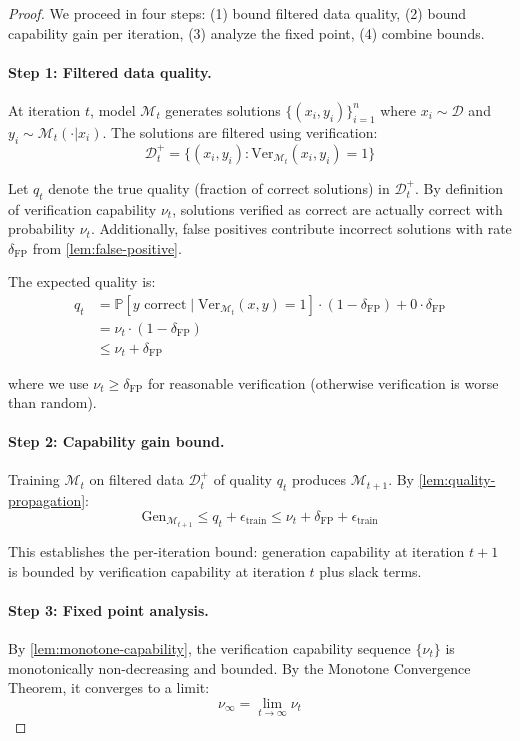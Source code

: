 \documentclass{article}
\theoremstyle{definition}
\theoremstyle{remark}
\newcommand{\M}{\mathcal{M}}
\newcommand{\D}{\mathcal{D}}
\newcommand{\Gen}{\text{Gen}}
\newcommand{\Ver}{\text{Ver}}
\newcommand{\Prob}{\mathbb{P}}
\begin{document}
\begin{proof}
We proceed in four steps: (1) bound filtered data quality, (2) bound capability gain per iteration, (3) analyze the fixed point, (4) combine bounds.

\paragraph{Step 1: Filtered data quality.}
At iteration \(t\), model \(\M_t\) generates solutions \(\{(x_i, y_i)\}_{i=1}^n\) where \(x_i \sim \D\) and \(y_i \sim \M_t(\cdot | x_i)\). The solutions are filtered using verification:
\[
\D_t^+ = \{(x_i, y_i) : \Ver_{\M_t}(x_i, y_i) = 1\}
\]

Let \(q_t\) denote the true quality (fraction of correct solutions) in \(\D_t^+\). By definition of verification capability \(\nu_t\), solutions verified as correct are actually correct with probability \(\nu_t\). Additionally, false positives contribute incorrect solutions with rate \(\delta_{\text{FP}}\) from \cref{lem:false-positive}.

The expected quality is:
\begin{align*}
q_t &= \Prob[y \text{ correct} \mid \Ver_{\M_t}(x,y) = 1] \cdot (1 - \delta_{\text{FP}}) + 0 \cdot \delta_{\text{FP}} \\
&= \nu_t \cdot (1 - \delta_{\text{FP}}) \\
&\leq \nu_t + \delta_{\text{FP}}
\end{align*}

where we use \(\nu_t \geq \delta_{\text{FP}}\) for reasonable verification (otherwise verification is worse than random).

\paragraph{Step 2: Capability gain bound.}
Training \(\M_t\) on filtered data \(\D_t^+\) of quality \(q_t\) produces \(\M_{t+1}\). By \cref{lem:quality-propagation}:
\[
\Gen_{\M_{t+1}} \leq q_t + \epsilon_{\text{train}} \leq \nu_t + \delta_{\text{FP}} + \epsilon_{\text{train}}
\]

This establishes the per-iteration bound: generation capability at iteration \(t+1\) is bounded by verification capability at iteration \(t\) plus slack terms.

\paragraph{Step 3: Fixed point analysis.}
By \cref{lem:monotone-capability}, the verification capability sequence \(\{\nu_t\}\) is monotonically non-decreasing and bounded. By the Monotone Convergence Theorem, it converges to a limit:
\[
\nu_\infty = \lim_{t \to \infty} \nu_t
\]


\end{proof}
\end{document}
